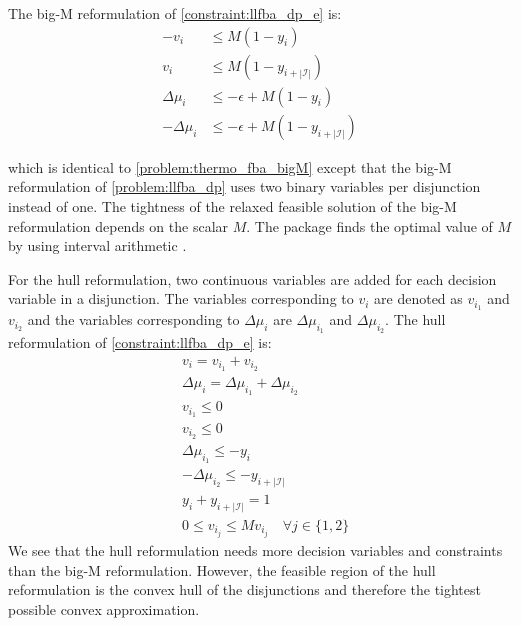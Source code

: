 The big-M reformulation of \cref{constraint:llfba_dp_e} is:
\begin{align*}
    -v_i &\leq M (1 - y_i) \\
    v_i &\leq M (1- y_{i + |\mathcal{I}|}) \\
    \Delta \mu_i &\leq -\epsilon + M (1 - y_i) \\ 
    - \Delta \mu_i &\leq -\epsilon + M(1 - y_{i + |\mathcal{I}|})
\end{align*}

\quad which is identical to \cref{problem:thermo_fba_bigM} except that the big-M reformulation of \cref{problem:llfba_dp} uses two binary variables per disjunction instead of one.
The tightness of the relaxed feasible solution of the big-M reformulation depends on the scalar $M$. The package finds the optimal value of $M$ by using interval arithmetic \cite{hutchison_automating_2010}.

For the hull reformulation, two continuous variables are added for each decision variable in a disjunction. The variables corresponding to $v_i$ are denoted as $v_{i_1}$ and $v_{i_2}$ and the variables corresponding to $\Delta \mu_i$ are $\Delta \mu_{i_1}$ and $\Delta \mu_{i_2}$. The hull reformulation of \cref{constraint:llfba_dp_e} is:
\begin{align*}
    &v_i = v_{i_1} + v_{i_2} \\
    &\Delta \mu_i = \Delta \mu_{i_1} + \Delta \mu_{i_2} \\
    &v_{i_1} \leq 0 \\
    &v_{i_2} \leq 0 \\
    &\Delta \mu_{i_1} \leq - y_i \\ 
    &- \Delta \mu_{i_2} \leq -y_{i + |\mathcal{I}|} \\
    &y_i + y_{i + |\mathcal{I}|} = 1 \\
    &0 \leq v_{i_j} \leq M v_{i_j}  \quad \forall j \in \{1,2\}
\end{align*}
We see that the hull reformulation needs more decision variables and constraints than the big-M reformulation. However, the feasible region of the hull reformulation is the convex hull of the disjunctions and therefore the tightest possible convex approximation. 


